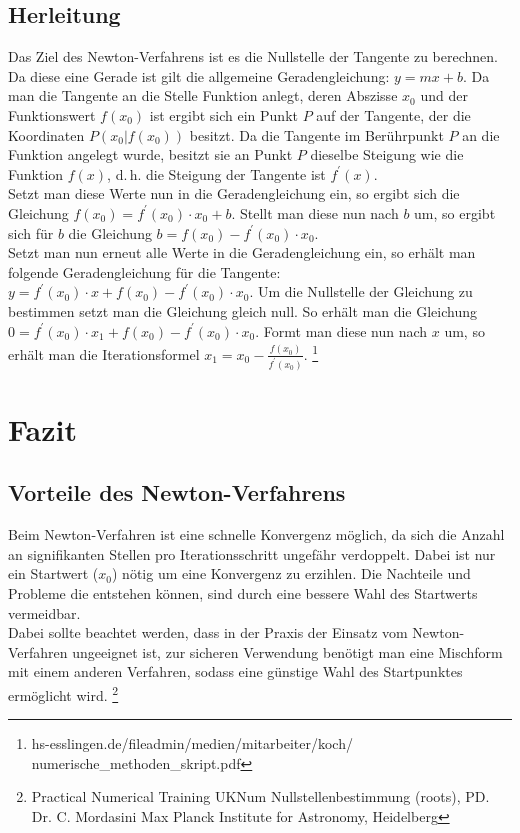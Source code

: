\documentclass[a4paper,12pt,fleqn,oneside]{article}
\begin{document}
	\subsection{Herleitung}
		Das Ziel des Newton-Verfahrens ist es die Nullstelle der Tangente zu berechnen. Da diese eine Gerade ist gilt die allgemeine Geradengleichung:
		$y = mx + b$. Da man die Tangente an die Stelle Funktion anlegt, deren Abszisse $x_0$ und der Funktionswert $f(x_0)$ ist ergibt sich ein Punkt
		$P$ auf der Tangente, der die Koordinaten $P(x_0|f(x_0))$ besitzt. Da die Tangente im Berührpunkt $P$ an die Funktion angelegt wurde, besitzt
		sie an Punkt $P$ dieselbe Steigung wie die Funktion $f(x)$, d.\,h. die Steigung der Tangente ist $f^\prime(x)$.\\
		Setzt man diese Werte nun in die Geradengleichung ein, so ergibt sich die Gleichung $f(x_0) = f^\prime(x_0) \cdot x_0  + b$. Stellt man diese
		nun nach $b$ um, so ergibt sich für $b$ die Gleichung $b = f(x_0) - f^\prime(x_0) \cdot x_0$.\\
		Setzt man nun erneut alle Werte in die Geradengleichung ein, so erhält man folgende Geradengleichung für die Tangente:
		$y = f^\prime(x_0) \cdot x  + f(x_0) - f^\prime(x_0) \cdot x_0$. Um die Nullstelle der Gleichung zu bestimmen setzt man die Gleichung gleich
		null. So erhält man die Gleichung $0 = f^\prime(x_0) \cdot x_1  + f(x_0) - f^\prime(x_0) \cdot x_0$. Formt man diese nun nach $x$ um, so
		erhält man die Iterationsformel $x_1 =x_0 - \frac{f(x_0)}{f^\prime(x_0)}$.
		\footnote{hs-esslingen.de/fileadmin/medien/mitarbeiter/koch/\\numerische\_methoden\_skript.pdf}
	
\newpage
		
\section{Fazit}
	\subsection{Vorteile des Newton-Verfahrens}
		Beim Newton-Verfahren ist eine schnelle Konvergenz möglich, da sich die Anzahl an signifikanten Stellen pro Iterationsschritt ungefähr verdoppelt.
		Dabei ist nur ein Startwert ($x_0$) nötig um eine Konvergenz zu erzihlen. Die Nachteile und Probleme die entstehen können, sind durch eine
		bessere Wahl des Startwerts vermeidbar.\\
		Dabei sollte beachtet werden, dass in der Praxis der Einsatz vom Newton-Verfahren ungeeignet ist, zur sicheren Verwendung benötigt man eine
		Mischform mit einem anderen Verfahren, sodass eine günstige Wahl des Startpunktes ermöglicht wird.
		\footnote{Practical Numerical Training UKNum Nullstellenbestimmung (roots), PD. Dr. C. Mordasini Max Planck Institute for Astronomy, Heidelberg}
	
\end{document}
